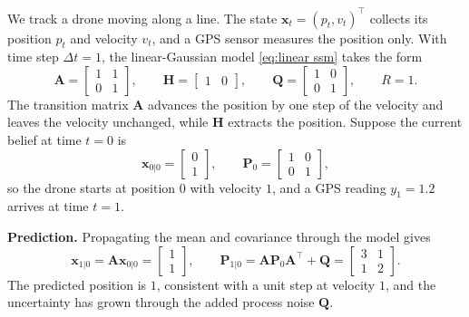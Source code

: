 \begin{example}\label{ex:kalman_numerical}
We track a drone moving along a line. The state $\mathbf{x}_t = (p_t, v_t)^\top$ collects its position $p_t$ and velocity $v_t$, and a GPS sensor measures the position only. With time step $\Delta t = 1$, the linear-Gaussian model \eqref{eq:linear ssm} takes the form
\[
    \mathbf{A} = \begin{bmatrix} 1 & 1 \\ 0 & 1 \end{bmatrix}, \qquad
    \mathbf{H} = \begin{bmatrix} 1 & 0 \end{bmatrix}, \qquad
    \mathbf{Q} = \begin{bmatrix} 1 & 0 \\ 0 & 1 \end{bmatrix}, \qquad
    R = 1 .
\]
The transition matrix $\mathbf{A}$ advances the position by one step of the velocity and leaves the velocity unchanged, while $\mathbf{H}$ extracts the position. Suppose the current belief at time $t = 0$ is
\[
    \mathbf{x}_{0|0} = \begin{bmatrix} 0 \\ 1 \end{bmatrix}, \qquad
    \mathbf{P}_0 = \begin{bmatrix} 1 & 0 \\ 0 & 1 \end{bmatrix},
\]
so the drone starts at position $0$ with velocity $1$, and a GPS reading $y_1 = 1.2$ arrives at time $t = 1$.

\textbf{Prediction.} Propagating the mean and covariance through the model gives
\[
    \mathbf{x}_{1|0} = \mathbf{A}\mathbf{x}_{0|0} = \begin{bmatrix} 1 \\ 1 \end{bmatrix}, \qquad
    \mathbf{P}_{1|0} = \mathbf{A}\mathbf{P}_0\mathbf{A}^\top + \mathbf{Q} = \begin{bmatrix} 3 & 1 \\ 1 & 2 \end{bmatrix}.
\]
The predicted position is $1$, consistent with a unit step at velocity $1$, and the uncertainty has grown through the added process noise $\mathbf{Q}$.


\end{example}
